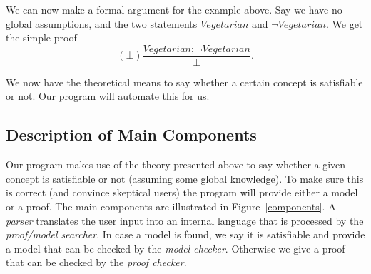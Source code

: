 We can now make a formal argument for the example above. Say we have no global
assumptions, and the two statements $Vegetarian$ and
$\lnot Vegetarian$. We get the simple proof
\[
(\bot) \frac{Vegetarian; \lnot Vegetarian}{\bot}.
\]

We now have the theoretical means to say whether a certain concept is satisfiable
or not. Our program will automate this for us.

\subsection{Description of Main Components}

Our program makes use of the theory presented above to say whether a given concept
is satisfiable or not (assuming some global knowledge). To make sure this is correct
(and convince skeptical users) the program will provide either a model or a proof.
The main components are illustrated in Figure~\ref{components}. A \emph{parser} translates
the user input into an internal language that is processed by the
\emph{proof/model searcher}.
In case a model is found, we say it is satisfiable and provide a model that can be
checked by the \emph{model checker}. Otherwise we give a proof that can be checked
by the \emph{proof checker}.

